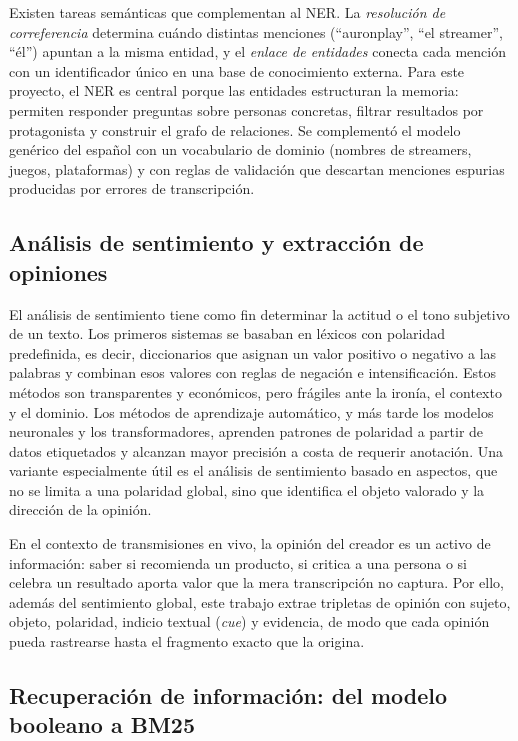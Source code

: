\documentclass[12pt,a4paper]{article}
\begin{document}
Existen tareas semánticas que complementan al NER. La \emph{resolución de correferencia} determina cuándo distintas menciones (``auronplay'', ``el streamer'', ``él'') apuntan a la misma entidad, y el \emph{enlace de entidades} conecta cada mención con un identificador único en una base de conocimiento externa. Para este proyecto, el NER es central porque las entidades estructuran la memoria: permiten responder preguntas sobre personas concretas, filtrar resultados por protagonista y construir el grafo de relaciones. Se complementó el modelo genérico del español con un vocabulario de dominio (nombres de streamers, juegos, plataformas) y con reglas de validación que descartan menciones espurias producidas por errores de transcripción.

\subsection{Análisis de sentimiento y extracción de opiniones}

El análisis de sentimiento tiene como fin determinar la actitud o el tono subjetivo de un texto. Los primeros sistemas se basaban en léxicos con polaridad predefinida, es decir, diccionarios que asignan un valor positivo o negativo a las palabras y combinan esos valores con reglas de negación e intensificación. Estos métodos son transparentes y económicos, pero frágiles ante la ironía, el contexto y el dominio. Los métodos de aprendizaje automático, y más tarde los modelos neuronales y los transformadores, aprenden patrones de polaridad a partir de datos etiquetados y alcanzan mayor precisión a costa de requerir anotación. Una variante especialmente útil es el análisis de sentimiento basado en aspectos, que no se limita a una polaridad global, sino que identifica el objeto valorado y la dirección de la opinión.

En el contexto de transmisiones en vivo, la opinión del creador es un activo de información: saber si recomienda un producto, si critica a una persona o si celebra un resultado aporta valor que la mera transcripción no captura. Por ello, además del sentimiento global, este trabajo extrae tripletas de opinión con sujeto, objeto, polaridad, indicio textual (\emph{cue}) y evidencia, de modo que cada opinión pueda rastrearse hasta el fragmento exacto que la origina.

\subsection{Recuperación de información: del modelo booleano a BM25}
\end{document}
